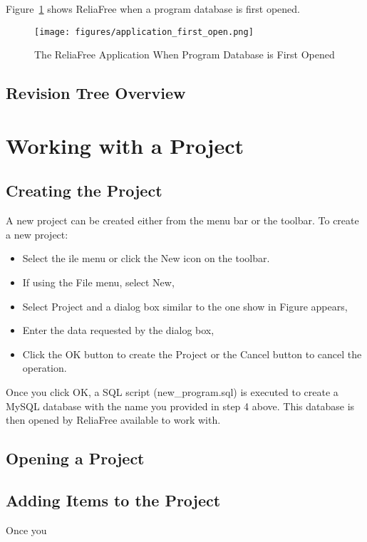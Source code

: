 \documentclass[11pt, 12pt, twoside, onecolumn]{book}
\begin{document}
\noindent Figure~\ref{program\_first\_open} shows ReliaFree when a program database is first opened.

	\begin{figure}[ht!]
		\centering
		\texttt{[image: figures/application\_first\_open.png]}
		\caption{The ReliaFree Application When Program Database is First Opened}\label{program\_first\_open}
	\end{figure}

\section{\textbf{Revision Tree Overview}}

\noindent 

\chapter{\textbf{Working with a Project}}

\section{\textbf{Creating the Project}}

\noindent A new project can be created either from the menu bar or the toolbar.  To create a new project:

\begin{itemize}
	\item Select the ile menu or click the New icon on the toolbar.
	\item If using the File menu, select New,
	\item Select Project and a dialog box similar to the one show in Figure appears,
	\item Enter the data requested by the dialog box,
	\item Click the OK button to create the Project or the Cancel button to cancel the operation.
\end{itemize}

\noindent Once you click OK, a SQL script (new\_program.sql) is executed to create a MySQL database with the name you provided in step 4 above.  This database is then opened by ReliaFree available to work with.

\section{\textbf{Opening a Project}}

\noindent
\section{\textbf{Adding Items to the Project}}

\noindent Once you
\end{document}
